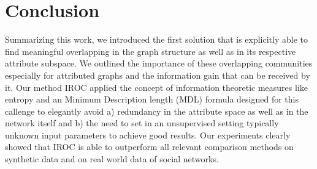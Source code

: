\section{Conclusion}
Summarizing this work, we introduced the first solution that is
explicitly able to find meaningful overlapping in the graph structure
as well as in its respective attribute subspace. We outlined the importance
of these overlapping communities especially for attributed graphs and the information
gain that can be received by it.
Our method IROC applied the concept of information theoretic measures like entropy
and an Minimum Description length (MDL) formula designed for this callenge
 to elegantly avoid a) redundancy in the attribute space as well as in the network itself and
 b) the need to set in an unsupervised setting typically unknown input parameters to achieve good results.
Our experiments clearly showed that IROC is able to outperform all relevant comparison methods on synthetic data and on real world data of social networks.
